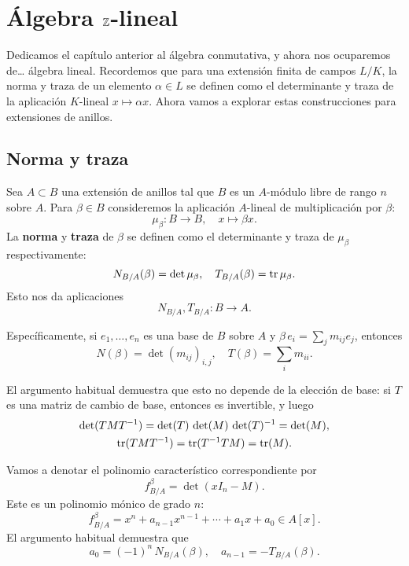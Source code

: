\chapter{Álgebra \texorpdfstring{$\mathbb{Z}$}{ℤ}-lineal}

Dedicamos el capítulo anterior al álgebra conmutativa, y ahora nos ocuparemos
de\dots{} álgebra lineal. Recordemos que para una extensión finita de campos
$L/K$, la norma y traza de un elemento $\alpha \in L$ se definen como el
determinante y traza de la aplicación $K$-lineal $x \mapsto \alpha x$.
Ahora vamos a explorar estas construcciones para extensiones de anillos.


\section{Norma y traza}

\begin{definicion}
  Sea $A \subset B$ una extensión de anillos tal que $B$ es un $A$-módulo libre
  de rango $n$ sobre $A$. Para $\beta \in B$ consideremos la aplicación
  $A$-lineal de multiplicación por $\beta$:
  $$\mu_\beta\colon B \to B, \quad x \mapsto \beta x.$$
  La \textbf{norma} y \textbf{traza} de $\beta$ se definen como el determinante
  y traza de $\mu_\beta$ respectivamente:
  $$N_{B/A} (\beta) = \det \mu_\beta, \quad T_{B/A} (\beta) = \operatorname{tr} \mu_\beta.$$
  Esto nos da aplicaciones
  $$N_{B/A}, T_{B/A}\colon B\to A.$$
\end{definicion}

Específicamente, si $e_1, \ldots, e_n$ es una base de $B$ sobre $A$ y
$\beta \, e_i = \sum_j m_{ij} e_j$, entonces
$$N (\beta) = \det (m_{ij})_{i,j}, \quad T (\beta) = \sum_i m_{ii}.$$

El argumento habitual demuestra que esto no depende de la elección de base:
si $T$ es una matriz de cambio de base, entonces es invertible, y luego
\begin{gather*}
  \det (T M T^{-1}) = \det (T) \, \det (M) \, \det (T)^{-1} = \det (M),\\
  \operatorname{tr} (T M T^{-1}) = \operatorname{tr} (T^{-1} T M) = \operatorname{tr} (M).
\end{gather*}

Vamos a denotar el polinomio característico correspondiente por
$$f^\beta_{B/A} = \det (x I_n - M).$$
Este es un polinomio mónico de grado $n$:
$$f^\beta_{B/A} = x^n + a_{n-1} x^{n-1} + \cdots + a_1 x + a_0 \in A [x].$$
El argumento habitual demuestra que
\begin{equation}
  \label{eqn:norma-y-traza-coeficientes-de-polinomio-caracteristico}
  a_0 = (-1)^n \, N_{B/A} (\beta), \quad a_{n-1} = -T_{B/A} (\beta).
\end{equation}

